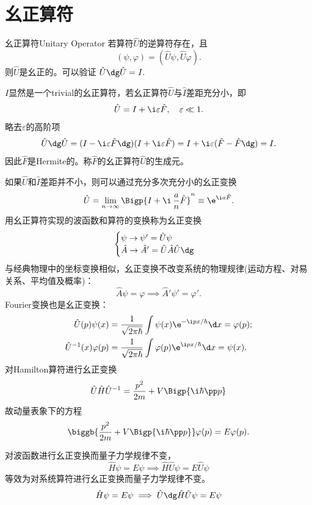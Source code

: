 \section{幺正算符}
\begin{definition}{幺正算符}{Unitary Operator}
	若算符$\hat U$的逆算符存在，且
	\[
		(\psi,\varphi)=(\hat U\psi,\hat U\varphi).
\]
	则$\hat U$是幺正的。可以验证
	$\hat U\dg\hat U=I.$
\end{definition}
$I$显然是一个trivial的幺正算符，若幺正算符$\hat U$与$\hat I$差距充分小，即
\[
	\hat U=I+\i\varepsilon\hat F,\quad\varepsilon\ll 1.
\]
略去$\varepsilon$的高阶项
\[
	\hat U\dg\hat U=(I-\i\varepsilon\hat F\dg)(I+\i\varepsilon\hat F)=I+\i\varepsilon(\hat F-\hat F\dg)=I.
\]
因此$\hat F$是Hermite的。称$\hat F$的幺正算符$\hat U$的生成元。

如果$\hat U$和$\hat I$差距并不小，则可以通过充分多次充分小的幺正变换
\begin{align}
	\hat U=\lim_{n\to\infty}\Bigp{I+\i\,\frac an\hat F}^n\equiv\e^{\i a\hat F}.
\end{align}
用幺正算符实现的波函数和算符的变换称为幺正变换
\begin{align}
	\begin{cases}
		\psi\to\psi'=\hat U\psi\\
		\hat A\to\hat A'=\hat U\hat A\hat U\dg
	\end{cases}
\end{align}
与经典物理中的坐标变换相似，幺正变换不改变系统的物理规律(运动方程、对易关系、平均值及概率)：
\[
	\hat A\psi=\varphi\implies\hat A'\psi'=\varphi'.
\]
Fourier变换也是幺正变换：
\begin{align}
	\hat U(p)\psi(x)&=\frac1{\sqrt{2\pi\hbar}}\int\psi(x)\e^{-\i px/\hbar}\d x=\varphi(p);\\
	\hat U^{-1}(x)\varphi(p)&=\frac1{\sqrt{2\pi\hbar}}\int\varphi(p)\e^{\i px/\hbar}\d x=\psi(x).
\end{align}
对Hamilton算符进行幺正变换
\begin{align}
	\hat U\hat H\hat U^{-1}=\frac{p^2}{2m}+V\Bigp{\i\hbar\pp p}
\end{align}
故动量表象下的\Schr 方程 
\begin{align}
	\biggb{\frac{p^2}{2m}+V\Bigp{\i\hbar\pp p}}\varphi(p)=E\varphi(p).
\end{align}

对波函数进行幺正变换而量子力学规律不变，
\[
	\hat H\psi=E\psi\implies\hat H\hat U\psi=E\hat U\psi
\]
等效为对系统算符进行幺正变换而量子力学规律不变。
\[
	\hat H\psi=E\psi\implies\hat U\dg\hat H\hat U\psi=E\psi
\]


